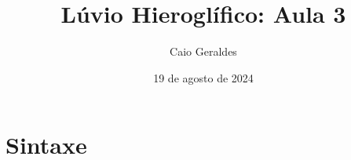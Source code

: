 \documentclass[article]{luvita}
\title{Lúvio Hieroglífico: Aula 3}
\author{Caio Geraldes}
\date{19 de agosto de 2024}
\begin{document}
\frontmatter

\mainmatter%

\maketitle

\chapter{Sintaxe}



\backmatter%

\printbibliography%
\end{document}
